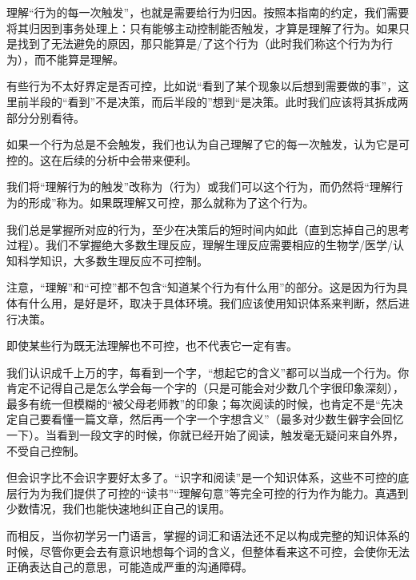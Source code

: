 理解“行为的每一次触发”，也就是需要给行为归因。按照本指南的约定，我们需要将其归因到事务处理上：只有能够主动控制能否触发，才算是理解了行为。如果只是找到了无法避免的原因，那只能算是/了这个行为（此时我们称这个行为为行为），而不能算是理解。
\begin{explain}
有些行为不太好界定是否可控，比如说“看到了某个现象以后想到需要做的事”，这里前半段的“看到”不是决策，而后半段的”想到“是决策。此时我们应该将其拆成两部分分别看待。

如果一个行为总是不会触发，我们也认为自己理解了它的每一次触发，认为它是可控的。这在后续的分析中会带来便利。
\end{explain}
\label{def:理解行为}我们将“理解行为的触发”改称为（行为）或我们可以这个行为，而仍然将“理解行为的形成”称为。如果既理解又可控，那么就称为了这个行为。
\begin{examples}
我们总是掌握所对应的行为，至少在决策后的短时间内如此（直到忘掉自己的思考过程）。我们不掌握绝大多数生理反应，理解生理反应需要相应的生物学/医学/认知科学知识，大多数生理反应不可控制。

注意，“理解”和“可控”都不包含“知道某个行为有什么用”的部分。这是因为行为具体有什么用，是好是坏，取决于具体环境。我们应该使用知识体系来判断，然后进行决策。%
\end{examples}
即使某些行为既无法理解也不可控，也不代表它一定有害。
\begin{examples}
我们认识成千上万的字，每看到一个字，“想起它的含义”都可以当成一个行为。你肯定不记得自己是怎么学会每一个字的（只是可能会对少数几个字很印象深刻），最多有统一但模糊的“被父母老师教”的印象；每次阅读的时候，也肯定不是“先决定自己要看懂一篇文章，然后再一个字一个字想含义”（最多对少数生僻字会回忆一下）。当看到一段文字的时候，你就已经开始了阅读，触发毫无疑问来自外界，不受自己控制。

但会识字比不会识字要好太多了。“识字和阅读”是一个知识体系，这些不可控的底层行为为我们提供了可控的“读书”“理解句意”等完全可控的行为作为能力。真遇到少数情况，我们也能快速地纠正自己的误用。

而相反，当你初学另一门语言，掌握的词汇和语法还不足以构成完整的知识体系的时候，尽管你更会去有意识地想每个词的含义，但整体看来这不可控，会使你无法正确表达自己的意思，可能造成严重的沟通障碍。
\end{examples}

